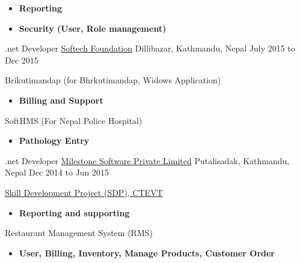 \begin{cventries}
{\begin{cvitems}
\begin{itemize}
			\item {\textbf{Reporting}}
				\item {\textbf{Security (User, Role management)}}
		\end{itemize}
	\end{cvitems}
}
  \cventry
    {.net Developer} %
    {\href{http://softechfoundation.com/}{Softech Foundation}} %
    {Dillibazar, Kathmandu, Nepal} %
    {July 2015 to Dec 2015} %
    {
    	\begin{cvitems} %
    		\item {Brikutimandap (for Bhrkutimandap, Widows Application)}
    		\begin{itemize}
    			\item {\textbf{Billing and Support}}
    		\end{itemize}
    		\item {SoftHMS (For Nepal Police Hospital)}
    		\begin{itemize}
    			\item {\textbf{Pathology Entry}}
    		\end{itemize}
    	\end{cvitems}
    }
 
  \cventry
    {.net Developer} %
    {\href{http://milestonesoftware.com.np/}{Milestone Software Private Limited}} %
    {Putalisadak, Kathmandu, Nepal} %
    {Dec 2014 to Jun 2015} %
    {
      \begin{cvitems} %
        \item {\href{http://202.45.144.216/}{Skill Development Project (SDP), CTEVT}}
        \begin{itemize}
        \item {\textbf{Reporting and supporting}}
        \end{itemize}
        \item {Restaurant Management System (RMS)}
        \begin{itemize}
        \item {\textbf{User, Billing, Inventory, Manage Products, Customer Order}}
        \end{itemize}
      \end{cvitems}
    }


\end{cventries}
